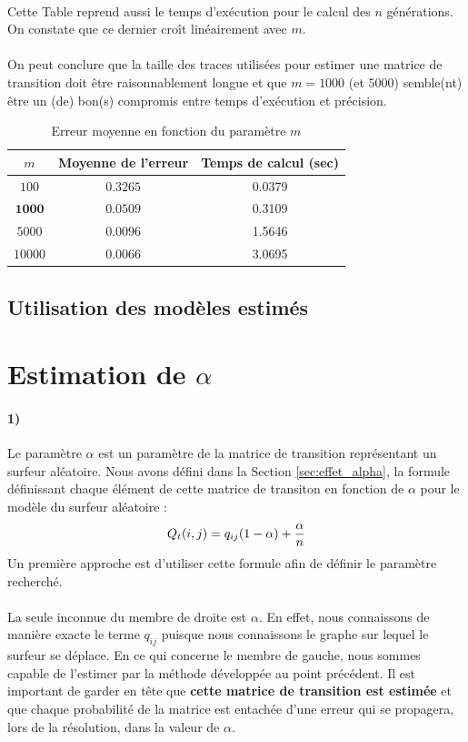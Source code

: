 \documentclass[a4paper,titlepage]{report}
\begin{document}
\paragraph{}
Cette Table reprend aussi le temps d'exécution pour le calcul des $n$ générations. On constate que ce dernier croît linéairement avec $m$. 
\paragraph{}
On peut conclure que la taille des traces utilisées pour estimer une matrice de transition doit être raisonnablement longue et que $m = 1000$ (et $5000$) semble(nt) être un (de) bon(s) compromis entre temps d'exécution et précision.
\begin{table}[ht]
	\center
	\begin{tabular}{|c|c|c|}
		\hline
		$m$ & \textbf{Moyenne de l'erreur} & \textbf{Temps de calcul} (sec)\\
		\hline
		$100$ & $0.3265$ & 0.0379\\
		$\mathbf{1000}$ & $\mathbf{0.0509}$ & 0.3109\\
		$5000$ & $0.0096$ & 1.5646\\
		$10000$ & $0.0066$ & 3.0695 \\
		\hline
	\end{tabular}
	\caption{Erreur moyenne en fonction du paramètre $m$}
	\label{tab:eqm_m}
\end{table}
\subsection{Utilisation des modèles estimés}
\section{Estimation de $\alpha$}
\paragraph{1)} Le paramètre $\alpha$ est un paramètre de la matrice de transition représentant un surfeur aléatoire. Nous avons défini dans la Section \ref{sec:effet_alpha}, la formule définissant chaque élément de cette matrice de transiton en fonction de $\alpha$ pour le modèle du surfeur aléatoire : 
\[
Q_t(i,j) = q_{ij} (1 - \alpha) + \dfrac{\alpha}{n}\\
\]
Un première approche est d'utiliser cette formule afin de définir le paramètre recherché. 
\paragraph{}
La seule inconnue du membre de droite est $\alpha$. En effet, nous connaissons de manière exacte le terme $q_{ij}$ puisque nous connaissons le graphe sur lequel le surfeur se déplace. En ce qui concerne le membre de gauche, nous sommes capable de l'estimer par la méthode développée au point précédent. Il est important de garder en tête que \textbf{cette matrice de transition est estimée} et que chaque probabilité de la matrice est entachée d'une erreur qui se propagera, lors de la résolution, dans la valeur de $\alpha$. 
\end{document}
